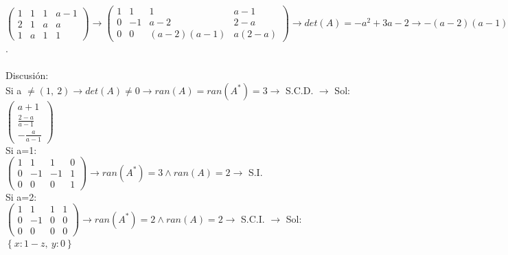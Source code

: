 \documentclass[addpoints,spanish, 12pt,a4paper]{exam}
\begin{document}
\begin{questions}
\begin{parts}
\end{parts}
\begin{solution}
$\left(\begin{matrix}1 & 1 & 1 & a - 1\\2 & 1 & a & a\\1 & a & 1 & 1\end{matrix}\right) \to \left(\begin{matrix}1 & 1 & 1 & a - 1\\0 & -1 & a - 2 & 2 - a\\0 & 0 & \left(a - 2\right) \left(a - 1\right) & a \left(2 - a\right)\end{matrix}\right)\to det(A)=- a^{2} + 3 a - 2\to- \left(a - 2\right) \left(a - 1\right)$. \\ \\ Discusión: \\Si a $\neq\left( 1, \  2\right)\to det(A) \neq 0 \to ran(A)=ran(A^*)=3 \to $ S.C.D. $\to$ Sol:$\left(\begin{matrix}a + 1\\\frac{2 - a}{a - 1}\\- \frac{a}{a - 1}\end{matrix}\right)$ \\Si a=1: \\ $\left(\begin{matrix}1 & 1 & 1 & 0\\0 & -1 & -1 & 1\\0 & 0 & 0 & 1\end{matrix}\right) \to ran(A^*)=3 \land ran(A)=2 \to$  S.I. \\Si a=2: \\ $\left(\begin{matrix}1 & 1 & 1 & 1\\0 & -1 & 0 & 0\\0 & 0 & 0 & 0\end{matrix}\right) \to ran(A^*)=2 \land ran(A)=2 \to$  S.C.I.  $\to$ Sol:$\left\{ x : 1 - z, \  y : 0\right\}$
\end{solution}
\addpoints





\end{questions}
\end{document}
